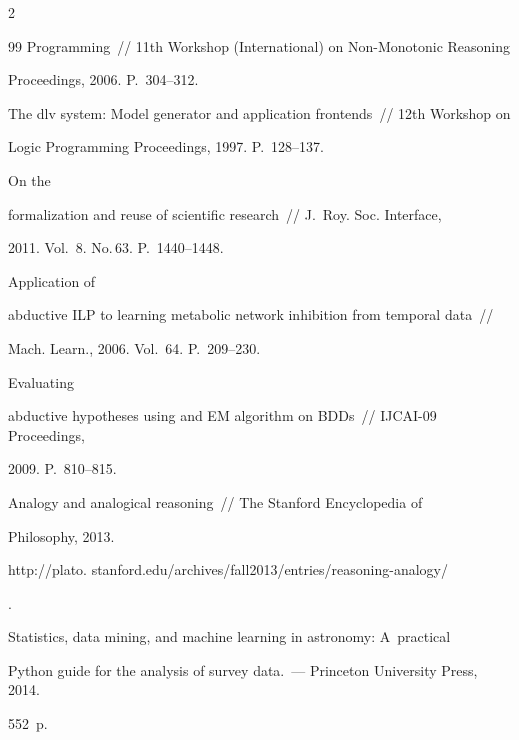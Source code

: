 \begin{multicols}{2}
{{\begin{thebibliography}{99}
Programming~// 11th Workshop (International) on Non-Monotonic Reasoning


Proceedings, 2006. P.~304--312.






The dlv system: Model generator and application frontends~// 12th Workshop on


Logic Programming Proceedings, 1997.  P.~128--137.




 On the


formalization and reuse of scientific research~// J.~Roy. Soc. Interface,


2011. Vol.~8. No.\,63.  P.~1440--1448.




 Application of


abductive ILP to learning metabolic network inhibition from temporal data~//


Mach. Learn., 2006. Vol.~64.  P.~209--230.




 Evaluating


abductive hypotheses using and EM algorithm on BDDs~// IJCAI-09 Proceedings,


2009. P.~810--815.




 Analogy and analogical reasoning~// The Stanford Encyclopedia of


Philosophy, 2013. {\sf


http://plato. stanford.edu/archives/fall2013/entries/reasoning-analogy/}.




 Statistics, data mining, and machine learning in astronomy: A~practical


Python guide for the analysis of survey data.~--- Princeton University Press, 2014.


552~p.





\end{thebibliography}}}
\end{multicols}

